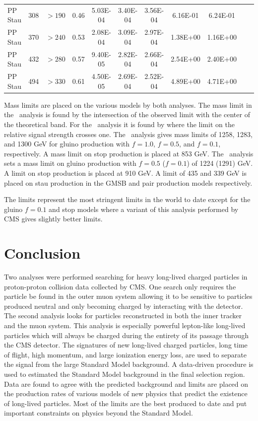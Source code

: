 \begin{table}
\begin{center}
\begin{tabular}{|l|c|c|c|c|c|c|c|c|c|c|}
PP Stau              &  308 & $>190$  &   0.46 & 5.03E-04 & 3.40E-04 & 3.56E-04 & 6.16E-01 & 6.24E-01\\
PP Stau              &  370 & $>240$  &   0.53 & 2.08E-04 & 3.09E-04 & 2.97E-04 & 1.38E+00 & 1.16E+00\\
PP Stau              &  432 & $>280$  &   0.57 & 9.40E-05 & 2.82E-04 & 2.66E-04 & 2.54E+00 & 2.40E+00\\
PP Stau              &  494 & $>330$  &   0.61 & 4.50E-05 & 2.69E-04 & 2.52E-04 & 4.89E+00 & 4.71E+00\\
\hline
  \end{tabular}
 \end{center}
\end{table}

Mass limits are placed on the various models by both analyses. The mass limit in the \muononly\ analysis is found by the intersection of the observed limit with the center
of the theoretical band. For the \tktof\ analysis it is found by where the limit on the relative signal strength crosses one. 
The \muononly\ analysis gives mass limits of 1258, 1283, and 1300 GeV for gluino production with 
$f=1.0$, $f=0.5$, and $f=0.1$, respectively. A mass limit on stop production is placed at 853 GeV. The \tktof\ analysis sets a mass limit on gluino production with
$f=0.5$ ($f=0.1$) of 1224 (1291) GeV. A limit on stop production is placed at 910 GeV. A limit of 435 and 339 GeV is placed on stau production in the GMSB and pair
production models respectively.

The limits represent the most stringent limits in the world to date except for the gluino $f=0.1$ and stop models where a variant of this analysis performed by CMS
gives slightly better limits.

\section{Conclusion}
Two analyses were performed searching for heavy long-lived charged particles in proton-proton collision data collected by CMS. One search only requires the particle be found
in the outer muon system allowing it to be sensitive to particles produced neutral and only becoming charged by interacting with the detector. The second analysis looks
for particles reconstructed in both the inner tracker and the muon system. This analysis is especially powerful lepton-like long-lived particles which will always be charged
during the entirety of its passage through the CMS detector. The signatures of new long-lived charged particles, long time of flight, high momentum, and large ionization
energy loss, are used to separate the signal from the large Standard Model background. A data-driven procedure is used to estimated the Standard Model background in the
final selection region. Data are found to agree with the predicted background and limits are placed on the production rates of various models of new physics that predict
the existence of long-lived particles. Most of the limits are the best produced to date and put important constraints on physics beyond the Standard Model.